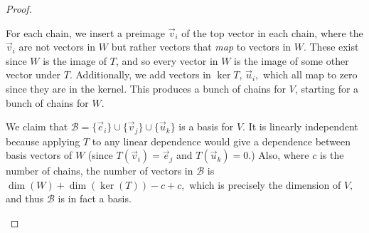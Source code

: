\begin{proof}
\begin{itemize}
\begin{center}
\end{center}

For each chain, we insert a preimage $\vec{v}_i$ of the top vector in each chain, where the $\vec{v}_i$ are not vectors in $W$ but rather vectors that \emph{map} to vectors in $W.$ These exist since $W$ is the image of $T$, and so every vector in $W$ is the image of some other vector under $T.$ Additionally, we add vectors in $\ker T$, $\vec{u}_i,$ which all map to zero since they are in the kernel. This produces a bunch of chains for $V$, starting for a bunch of chains for $W.$

We claim that $\mathcal{B} = \{\vec{e}_i\} \cup \{\vec{v}_j\} \cup \{\vec{u}_k\}$ is a basis for $V.$ It is linearly independent because applying $T$ to any linear dependence would give a dependence between basis vectors of $W$ (since $T(\vec{v}_i) = \vec{e}_j$ and $T(\vec{u}_k) = 0$.) Also, where $c$ is the number of chains, the number of vectors in $\mathcal{B}$ is $\dim(W) + \dim(\ker(T)) - c + c,$ which is precisely the dimension of $V,$ and thus $\mathcal{B}$ is in fact a basis.




\end{itemize}
\end{proof}
